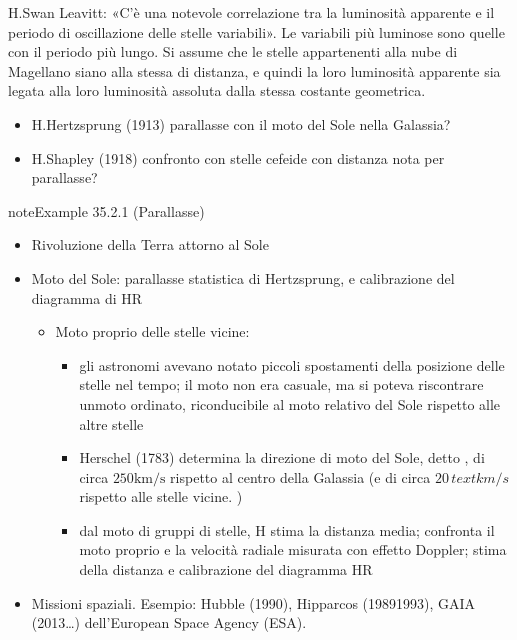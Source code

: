 \documentclass[letterpaper,10pt,italian]{jupyterBook}
\begin{document}
\sphinxAtStartPar
H.Swan Leavitt: «C’è una notevole correlazione tra la luminosità apparente e il periodo di oscillazione delle stelle variabili». Le variabili più luminose sono quelle con il periodo più lungo. Si assume che le stelle appartenenti alla nube di Magellano siano alla stessa di distanza, e quindi la loro luminosità apparente sia legata alla loro luminosità assoluta dalla stessa costante geometrica.
\begin{itemize}
\item {} 
\sphinxAtStartPar
H.Hertzsprung (1913) parallasse con il moto del Sole nella Galassia?

\item {} 
\sphinxAtStartPar
H.Shapley (1918) confronto con stelle cefeide con distanza nota per parallasse?

\end{itemize}
\label{ch/modern/astronomy-distance-ladder:example-0}
\begin{sphinxadmonition}{note}{Example 35.2.1 (Parallasse)}


\begin{itemize}
\item {} 
\sphinxAtStartPar
Rivoluzione della Terra attorno al Sole

\item {} 
\sphinxAtStartPar
Moto del Sole: parallasse statistica di Hertzsprung, e calibrazione del diagramma di H\sphinxhyphen{}R
\begin{itemize}
\item {} 
\sphinxAtStartPar
Moto proprio delle stelle vicine:
\begin{itemize}
\item {} 
\sphinxAtStartPar
gli astronomi avevano notato piccoli spostamenti della posizione delle stelle nel tempo; il moto non era casuale, ma si poteva riscontrare unmoto ordinato, riconducibile al moto relativo del Sole rispetto alle altre stelle

\item {} 
\sphinxAtStartPar
Herschel (1783) determina la direzione di moto del Sole, detto , di circa \(250 \text{km/s}\) rispetto al centro della Galassia (e di circa \(20 \, text{km/s}\) rispetto alle stelle vicine.  )

\item {} 
\sphinxAtStartPar
dal moto di gruppi di stelle, H stima la distanza media; confronta il moto proprio e la velocità radiale misurata con effetto Doppler; stima della distanza e calibrazione del diagramma H\sphinxhyphen{}R

\end{itemize}

\end{itemize}

\item {} 
\sphinxAtStartPar
Missioni spaziali. Esempio: Hubble (1990), Hipparcos (1989\sphinxhyphen{}1993), GAIA (2013\sphinxhyphen{}…) dell’European Space Agency (ESA).

\end{itemize}
\end{sphinxadmonition}
\end{document}

